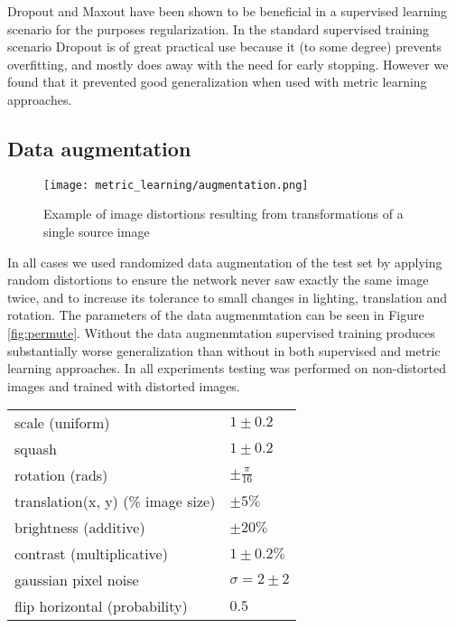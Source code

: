Dropout and Maxout have been shown to be beneficial in a supervised learning scenario for the purposes regularization. In the standard supervised training scenario Dropout is of great practical use because it (to some degree) prevents overfitting, and mostly does away with the need for early stopping. However we found that it prevented good generalization when used with metric learning approaches.

\subsection {Data augmentation}

\begin{figure}[h]
\centering
\texttt{[image: metric\_learning/augmentation.png]}
\caption{Example of image distortions resulting from transformations of a single source image}
\label{fig:augmentation}
\end{figure}


In all cases we used randomized data augmentation of the test set by applying random distortions to ensure the network never saw exactly the same image twice, and to increase its tolerance to small changes in lighting, translation and rotation. The parameters of the data augmenmtation can be seen in Figure \ref{fig:permute}. Without the data augmenmtation supervised training produces substantially worse generalization than without in both supervised and metric learning approaches. In all experiments testing was performed on non-distorted images and trained with distorted images.

\begin{table*}
  \centering
    \caption{Ranges of parameters used for image distortion }

  \begin{tabular}{ l  l }
    \toprule
    scale (uniform) & $ 1 \pm 0.2 $  \\ 
    squash  & $ 1 \pm 0.2 $  \\ 
    rotation (rads) & $ \pm \frac{\pi}{16} $ \\ 
    translation(x, y) (\% image size) & $ \pm 5 \% $ \\ 
    brightness (additive) & $ \pm 20 \% $ \\ 
    contrast (multiplicative) & $ 1 \pm 0.2 \% $ \\ 
    gaussian pixel noise & $ \sigma = 2 \pm 2 $  \\ 
    flip horizontal (probability) & $ 0.5 $ \\ 
    \bottomrule
  \end{tabular}
\label{fig:permute}
\end{table*}

